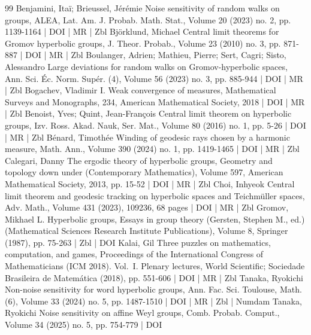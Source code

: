 \begin{thebibliography}{99}
 Benjamini, Itaï; Brieussel, Jérémie Noise sensitivity of random walks on groups, ALEA, Lat. Am. J. Probab. Math. Stat., Volume 20 (2023) no. 2, pp. 1139-1164 | DOI | MR | Zbl
 Björklund, Michael Central limit theorems for Gromov hyperbolic groups, J. Theor. Probab., Volume 23 (2010) no. 3, pp. 871-887 | DOI | MR | Zbl
 Boulanger, Adrien; Mathieu, Pierre; Sert, Cagri; Sisto, Alessandro Large deviations for random walks on Gromov-hyperbolic spaces, Ann. Sci. Éc. Norm. Supér. (4), Volume 56 (2023) no. 3, pp. 885-944 | DOI | MR | Zbl
 Bogachev, Vladimir I. Weak convergence of measures, Mathematical Surveys and Monographs, 234, American Mathematical Society, 2018 | DOI | MR | Zbl
 Benoist, Yves; Quint, Jean-François Central limit theorem on hyperbolic groups, Izv. Ross. Akad. Nauk, Ser. Mat., Volume 80 (2016) no. 1, pp. 5-26 | DOI | MR | Zbl
 Bénard, Timothée Winding of geodesic rays chosen by a harmonic measure, Math. Ann., Volume 390 (2024) no. 1, pp. 1419-1465 | DOI | MR | Zbl
 Calegari, Danny The ergodic theory of hyperbolic groups, Geometry and topology down under (Contemporary Mathematics), Volume 597, American Mathematical Society, 2013, pp. 15-52 | DOI | MR | Zbl
 Choi, Inhyeok Central limit theorem and geodesic tracking on hyperbolic spaces and Teichmüller spaces, Adv. Math., Volume 431 (2023), 109236, 68 pages | DOI | MR | Zbl
 Gromov, Mikhael L. Hyperbolic groups, Essays in group theory (Gersten, Stephen M., ed.) (Mathematical Sciences Research Institute Publications), Volume 8, Springer (1987), pp. 75-263 | Zbl | DOI
 Kalai, Gil Three puzzles on mathematics, computation, and games, Proceedings of the International Congress of Mathematicians (ICM 2018). Vol. I. Plenary lectures, World Scientific; Sociedade Brasileira de Matemática (2018), pp. 551-606 | DOI | MR | Zbl
 Tanaka, Ryokichi Non-noise sensitivity for word hyperbolic groups, Ann. Fac. Sci. Toulouse, Math. (6), Volume 33 (2024) no. 5, pp. 1487-1510 | DOI | MR | Zbl | Numdam
 Tanaka, Ryokichi Noise sensitivity on affine Weyl groups, Comb. Probab. Comput., Volume 34 (2025) no. 5, pp. 754-779 | DOI
\end{thebibliography}
